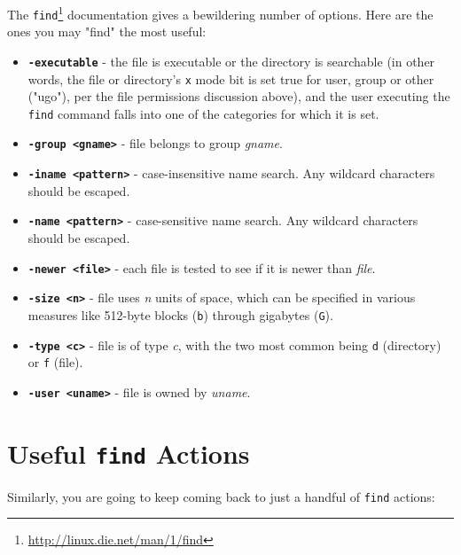 \documentclass[10pt,american,]{book}
\renewcommand{\href}[2]{#2\footnote{\url{#1}}}
\numberwithin{figure}{chapter}
\begin{document}
The \href{http://linux.die.net/man/1/find}{\texttt{find}} documentation
gives a bewildering number of options. Here are the ones you may "find"
the most useful:

\begin{itemize}
\item
  \textbf{\texttt{-executable}} - the file is executable or the
  directory is searchable (in other words, the file or directory's
  \texttt{x} mode bit is set true for user, group or other ("ugo"), per
  the file permissions discussion above), and the user executing the
  \texttt{find} command falls into one of the categories for which it is
  set.
\item
  \textbf{\texttt{-group\ \textless{}gname\textgreater{}}} - file
  belongs to group \emph{gname}.
\item
  \textbf{\texttt{-iname\ \textless{}pattern\textgreater{}}} -
  case-insensitive name search. Any wildcard characters should be
  escaped.
\item
  \textbf{\texttt{-name\ \textless{}pattern\textgreater{}}} -
  case-sensitive name search. Any wildcard characters should be escaped.
\item
  \textbf{\texttt{-newer\ \textless{}file\textgreater{}}} - each file is
  tested to see if it is newer than \emph{file}.
\item
  \textbf{\texttt{-size\ \textless{}n\textgreater{}}} - file uses
  \emph{n} units of space, which can be specified in various measures
  like 512-byte blocks (\texttt{b}) through gigabytes (\texttt{G}).
\item
  \textbf{\texttt{-type\ \textless{}c\textgreater{}}} - file is of type
  \emph{c}, with the two most common being \texttt{d} (directory) or
  \texttt{f} (file).
\item
  \textbf{\texttt{-user\ \textless{}uname\textgreater{}}} - file is
  owned by \emph{uname}.
\end{itemize}

\section*{\texorpdfstring{Useful \texttt{find}
Actions}{Useful find Actions}}\label{useful-find-actions}

Similarly, you are going to keep coming back to just a handful of
\texttt{find} actions:
\end{document}

